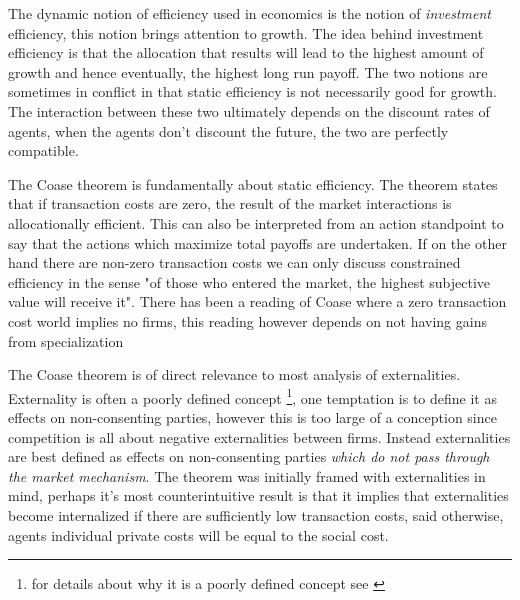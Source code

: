 \documentclass[12pt]{article}
\numberwithin{equation}{section}
\begin{document}
The dynamic notion of efficiency used in economics is the notion of \textit{investment} efficiency, this notion brings attention to growth. The idea behind investment efficiency is that the allocation that results will lead to the highest amount of growth and hence eventually, the highest long run payoff. The two notions are sometimes in conflict in that static efficiency is not necessarily good for growth. The interaction between these two ultimately depends on the discount rates of agents, when the agents don't discount the future, the two are perfectly compatible.

The Coase theorem is fundamentally about static efficiency. The theorem states that if transaction costs are zero, the result of the market interactions is allocationally efficient. This can also be interpreted from an action standpoint to say that the actions which maximize total payoffs are undertaken. If on the other hand there are non-zero transaction costs we can only discuss constrained efficiency in the sense "of those who entered the market, the highest subjective value will receive it". There has been a reading of Coase where a zero transaction cost world implies no firms, this reading however depends on not having gains from specialization \cite{demsetz2011rh}


The Coase theorem is of direct relevance to most analysis of externalities. Externality is often a poorly defined concept \footnote{for details about why it is a poorly defined concept see \cite{Cheung1970}}, one temptation is to define it as effects on non-consenting parties, however this is too large of a conception since competition is all about negative externalities between firms. Instead externalities are best defined as effects on non-consenting parties \textit{which do not pass through the market mechanism}. The theorem was initially framed with externalities in mind, perhaps it's most counterintuitive result is that it implies that externalities become internalized if there are sufficiently low transaction costs, said otherwise, agents individual private costs will be equal to the social cost.
\end{document}
